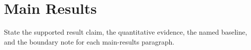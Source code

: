 \section{Main Results}


State the supported result claim, the quantitative evidence, the named baseline, and the boundary note for each main-results paragraph.
